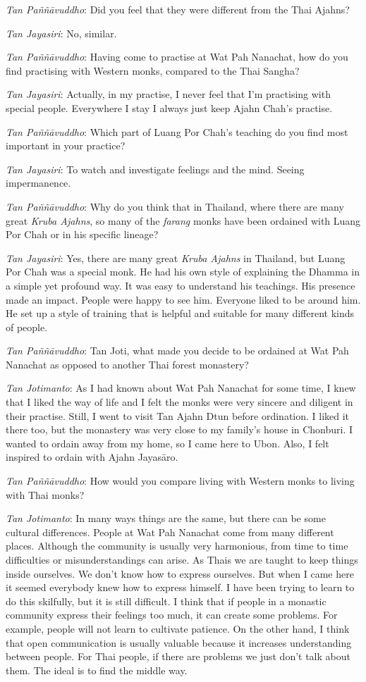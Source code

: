 \emph{Tan Paññāvuddho}: Did you feel that they were different from the
Thai Ajahns? 

\emph{Tan Jayasiri}: No, similar. 

\emph{Tan Paññāvuddho}: Having come to practise at Wat Pah Nanachat, 
how do you find practising with Western monks, compared to the Thai
Sangha? 

\emph{Tan Jayasiri}: Actually, in my practise, I never feel that I'm
practising with special people. Everywhere I stay I always just keep
Ajahn Chah's practise. 

\emph{Tan Paññāvuddho}: Which part of Luang Por Chah's teaching do you
find most important in your practice? 

\emph{Tan Jayasiri}: To watch and investigate feelings and the mind. 
Seeing impermanence. 

\emph{Tan Paññāvuddho}: Why do you think that in Thailand, where there
are many great \emph{Kruba Ajahns}, so many of the \emph{farang} monks
have been ordained with Luang Por Chah or in his specific lineage? 

\emph{Tan Jayasiri}: Yes, there are many great \emph{Kruba Ajahns}
in Thailand, but Luang Por Chah was a special monk. He had
his own style of explaining the Dhamma in a simple yet profound way. It
was easy to understand his teachings. His presence made an impact. 
People were happy to see him. Everyone liked to be around him. He set up
a style of training that is helpful and suitable for many different
kinds of people. 

\emph{Tan Paññāvuddho}: Tan Joti, what made you decide to be ordained
at Wat Pah Nanachat as opposed to another Thai forest monastery? 

\emph{Tan Jotimanto}: As I had known about Wat Pah Nanachat for some
time, I knew that I liked the way of life and I felt the monks were very
sincere and diligent in their practise. Still, I went to visit Tan Ajahn
Dtun before ordination. I liked it there too, but the monastery was very
close to my family's house in Chonburi. I wanted to ordain away from my
home, so I came here to Ubon. Also, I felt inspired to ordain with Ajahn
Jayasāro. 

\emph{Tan Paññāvuddho}: How would you compare living with Western monks
to living with Thai monks? 

\emph{Tan Jotimanto}: In many ways things are the same, but there can be
some cultural differences. People at Wat Pah Nanachat come from many
different places. Although the community is usually very harmonious, 
from time to time difficulties or misunderstandings can arise. As Thais
we are taught to keep things inside ourselves. We don't know how to
express ourselves. But when I came here it seemed everybody knew how to
express himself. I have been trying to learn to do this skilfully, but
it is still difficult. I think that if people in a monastic community
express their feelings too much, it can create some problems. For
example, people will not learn to cultivate patience. On the other hand, 
I think that open communication is usually valuable because it increases
understanding between people. For Thai people, if there are problems we
just don't talk about them. The ideal is to find the middle way. 

